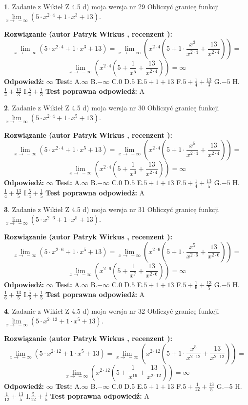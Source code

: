 \documentclass[12pt, a4paper]{article}
\theoremstyle{definition} %
\newtheorem{zad}{}
\newcommand{\zadStart}[1]{\begin{zad}#1\newline}
\newcommand{\zadStop}{\end{zad}}
\newcommand{\rozwStart}[2]{\noindent \textbf{Rozwiązanie (autor #1 , recenzent #2): }\newline}
\newcommand{\rozwStop}{\newline}
\newcommand{\odpStart}{\noindent \textbf{Odpowiedź:}\newline}
\newcommand{\odpStop}{\newline}
\newcommand{\testStart}{\noindent \textbf{Test:}\newline}
\newcommand{\testStop}{\newline}
\newcommand{\kluczStart}{\noindent \textbf{Test poprawna odpowiedź:}\newline}
\newcommand{\kluczStop}{\newline}
\begin{document}
\zadStart{Zadanie z Wikieł Z 4.5 d) moja wersja nr 29}
Obliczyć granicę funkcji  $\lim\limits_{x\to\ -\infty}(5 \cdot x^{2\cdot4}+1 \cdot x^{3}+13)$.
\zadStop
\rozwStart{Patryk Wirkus}{}
$$\lim\limits_{x\to\ -\infty}(5 \cdot x^{2\cdot4}+1 \cdot x^{3}+13) = \lim\limits_{x\to\ -\infty}(x^{2\cdot4}(5 +1 \cdot \frac{x^{3}}{x^{2\cdot4}}+\frac{13}{x^{2\cdot4}})) =$$ $$\lim\limits_{x\to\ -\infty}(x^{2\cdot4}(5 +\frac{1}{x^{5}}+\frac{13}{x^{2\cdot4}})) =\infty$$
\rozwStop
\odpStart
$\infty$
\odpStop
\testStart
A.$\infty$ B.$-\infty$ C.$0$ D.$5$ E.$5 + 1 + 13$
F.$5+\frac{1}{4}+\frac{13}{3}$ G.$-5$
H.$\frac{1}{4}+\frac{13}{3}$
I.$\frac{5}{4}+\frac{1}{3}$
\testStop
\kluczStart
A
\kluczStop



\zadStart{Zadanie z Wikieł Z 4.5 d) moja wersja nr 30}
Obliczyć granicę funkcji  $\lim\limits_{x\to\ -\infty}(5 \cdot x^{2\cdot4}+1 \cdot x^{5}+13)$.
\zadStop
\rozwStart{Patryk Wirkus}{}
$$\lim\limits_{x\to\ -\infty}(5 \cdot x^{2\cdot4}+1 \cdot x^{5}+13) = \lim\limits_{x\to\ -\infty}(x^{2\cdot4}(5 +1 \cdot \frac{x^{5}}{x^{2\cdot4}}+\frac{13}{x^{2\cdot4}})) =$$ $$\lim\limits_{x\to\ -\infty}(x^{2\cdot4}(5 +\frac{1}{x^{3}}+\frac{13}{x^{2\cdot4}})) =\infty$$
\rozwStop
\odpStart
$\infty$
\odpStop
\testStart
A.$\infty$ B.$-\infty$ C.$0$ D.$5$ E.$5 + 1 + 13$
F.$5+\frac{1}{4}+\frac{13}{5}$ G.$-5$
H.$\frac{1}{4}+\frac{13}{5}$
I.$\frac{5}{4}+\frac{1}{5}$
\testStop
\kluczStart
A
\kluczStop



\zadStart{Zadanie z Wikieł Z 4.5 d) moja wersja nr 31}
Obliczyć granicę funkcji  $\lim\limits_{x\to\ -\infty}(5 \cdot x^{2\cdot6}+1 \cdot x^{5}+13)$.
\zadStop
\rozwStart{Patryk Wirkus}{}
$$\lim\limits_{x\to\ -\infty}(5 \cdot x^{2\cdot6}+1 \cdot x^{5}+13) = \lim\limits_{x\to\ -\infty}(x^{2\cdot6}(5 +1 \cdot \frac{x^{5}}{x^{2\cdot6}}+\frac{13}{x^{2\cdot6}})) =$$ $$\lim\limits_{x\to\ -\infty}(x^{2\cdot6}(5 +\frac{1}{x^{7}}+\frac{13}{x^{2\cdot6}})) =\infty$$
\rozwStop
\odpStart
$\infty$
\odpStop
\testStart
A.$\infty$ B.$-\infty$ C.$0$ D.$5$ E.$5 + 1 + 13$
F.$5+\frac{1}{6}+\frac{13}{5}$ G.$-5$
H.$\frac{1}{6}+\frac{13}{5}$
I.$\frac{5}{6}+\frac{1}{5}$
\testStop
\kluczStart
A
\kluczStop



\zadStart{Zadanie z Wikieł Z 4.5 d) moja wersja nr 32}
Obliczyć granicę funkcji  $\lim\limits_{x\to\ -\infty}(5 \cdot x^{2\cdot12}+1 \cdot x^{5}+13)$.
\zadStop
\rozwStart{Patryk Wirkus}{}
$$\lim\limits_{x\to\ -\infty}(5 \cdot x^{2\cdot12}+1 \cdot x^{5}+13) = \lim\limits_{x\to\ -\infty}(x^{2\cdot12}(5 +1 \cdot \frac{x^{5}}{x^{2\cdot12}}+\frac{13}{x^{2\cdot12}})) =$$ $$\lim\limits_{x\to\ -\infty}(x^{2\cdot12}(5 +\frac{1}{x^{19}}+\frac{13}{x^{2\cdot12}})) =\infty$$
\rozwStop
\odpStart
$\infty$
\odpStop
\testStart
A.$\infty$ B.$-\infty$ C.$0$ D.$5$ E.$5 + 1 + 13$
F.$5+\frac{1}{12}+\frac{13}{5}$ G.$-5$
H.$\frac{1}{12}+\frac{13}{5}$
I.$\frac{5}{12}+\frac{1}{5}$
\testStop
\kluczStart
A
\kluczStop
\end{document}
